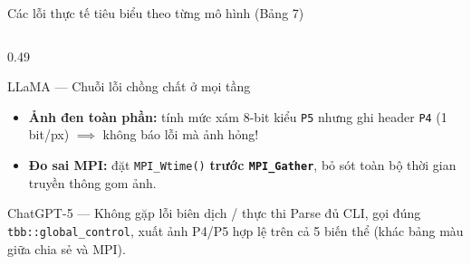 \documentclass[aspectratio=169,10pt]{beamer}
\newcommand{\code}[1]{\texttt{\color{BlueDark}#1}}
\begin{document}
\begin{frame}[fragile]{Các lỗi thực tế tiêu biểu theo từng mô hình (Bảng 7)}
\begin{columns}[T,totalwidth=\textwidth]
\begin{column}{0.49\textwidth}
\begin{bluebox}[height=3.95cm,top=3pt,bottom=3pt]{LLaMA --- Chuỗi lỗi chồng chất ở mọi tầng}
\begin{itemize}
        \item \textbf{Ảnh đen toàn phần:} tính mức xám 8-bit kiểu \code{P5} nhưng ghi header \code{P4} (1 bit/px) $\implies$ không báo lỗi mà ảnh hỏng!
        \item \textbf{Đo sai MPI:} đặt \code{MPI\_Wtime()} \textbf{trước \code{MPI\_Gather}}, bỏ sót toàn bộ thời gian truyền thông gom ảnh.
      \end{itemize}
    \end{bluebox}
    \vspace{0.18cm}
    \begin{hboxcard}[height=1.80cm,top=3pt,bottom=3pt]{ChatGPT-5 --- Không gặp lỗi biên dịch / thực thi}
      \scriptsize Parse đủ CLI, gọi đúng \code{tbb::global\_control}, xuất ảnh P4/P5 hợp lệ trên cả 5 biến thể (khác bảng màu giữa chia sẻ và MPI).
    \end{hboxcard}
  \end{column}
\end{columns}
\end{frame}
\end{document}
